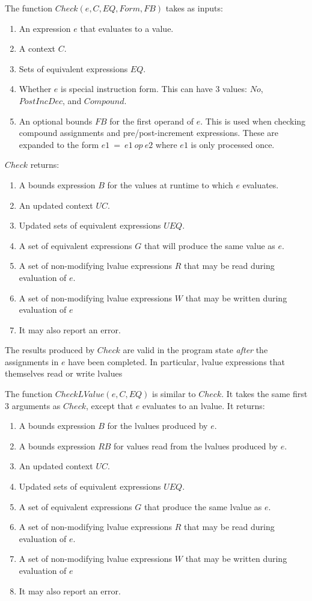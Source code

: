 The function $Check(e, C, EQ, Form, FB)$ takes as inputs:
\begin{enumerate}
\item An expression $e$ that evaluates to a value.
\item A context $C$.
\item Sets of equivalent expressions $EQ$.
\item Whether $e$ is special instruction form.  This can have 3 values: $No$, $PostIncDec$,
and $Compound$.
\item An optional bounds $FB$ for the first operand of $e$.  
This is used when checking compound assignments and pre/post-increment expressions.  These are
expanded to the form $e1~=~e1~op~e2$ where $e1$ is only processed once. 
\end{enumerate}

$Check$ returns:
\begin{enumerate}
\item A bounds expression $B$ for the values at runtime to which $e$ evaluates.
\item An updated context $\mathit{UC}$.
\item Updated sets of equivalent expressions $UEQ$.
\item A set of equivalent expressions $G$ that will produce the same value as $e$. 
\item A set of non-modifying lvalue expressions $R$ that may be read during evaluation of $e$.
\item A set of non-modifying lvalue expressions $W$ that may be written during evaluation of $e$
\item It may also report an error.
\end{enumerate}
The results produced by $Check$ are valid in the program state
{\em after} the assignments in $e$ have been completed.  In particular,
lvalue expressions that themselves read or write lvalues 

The function $CheckLValue(e, C, EQ)$ is similar to $Check$.  It takes the
same first 3 arguments as $Check$, except that $e$ evaluates to an lvalue.
It returns:
\begin{enumerate}
\item A bounds expression $B$ for the lvalues produced by $e$.
\item A bounds expression $RB$ for values read from the lvalues produced by $e$.
\item An updated context $\mathit{UC}$.
\item Updated sets of equivalent expressions $UEQ$.
\item A set of equivalent expressions $G$ that produce the same lvalue as $e$.
\item A set of non-modifying lvalue expressions $R$ that may be read during evaluation of $e$.
\item A set of non-modifying lvalue expressions $W$ that may be written during evaluation of $e$
\item It may also report an error.
\end{enumerate}


